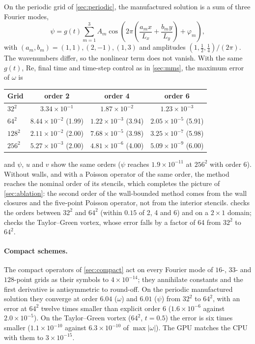 \documentclass[11pt,a4paper]{article}
\newcommand{\Rey}{\mathrm{Re}}
\newcommand{\code}[1]{\texttt{\detokenize{#1}}}
\begin{document}
On the periodic grid of \cref{sec:periodic}, the manufactured solution is a sum of three Fourier modes,
\begin{equation}
\psi=g(t)\sum_{m=1}^{3}A_m\cos\!\left(2\pi\left(\frac{a_mx}{L_x}+\frac{b_my}{L_y}\right)+\varphi_m\right),
\end{equation}
with $(a_m,b_m)=(1,1),(2,-1),(1,3)$ and amplitudes $(1,\tfrac12,\tfrac14)/(2\pi)$.  The wavenumbers differ, so the nonlinear term does not vanish.  With the same $g(t)$, $\Rey$, final time and time-step control as in \cref{sec:mms}, the maximum error of $\omega$ is
\begin{center}
\begin{tabular}{lccc}
\toprule
Grid & order 2 & order 4 & order 6 \\
\midrule
$32^2$ & $3.34\times10^{-1}$ & $1.87\times10^{-2}$ & $1.23\times10^{-3}$ \\
$64^2$ & $8.44\times10^{-2}$ (1.99) & $1.22\times10^{-3}$ (3.94) & $2.05\times10^{-5}$ (5.91) \\
$128^2$ & $2.11\times10^{-2}$ (2.00) & $7.68\times10^{-5}$ (3.98) & $3.25\times10^{-7}$ (5.98) \\
$256^2$ & $5.27\times10^{-3}$ (2.00) & $4.81\times10^{-6}$ (4.00) & $5.09\times10^{-9}$ (6.00) \\
\bottomrule
\end{tabular}
\end{center}
and $\psi$, $u$ and $v$ show the same orders ($\psi$ reaches $1.9\times10^{-11}$ at $256^2$ with order 6).  Without walls, and with a Poisson operator of the same order, the method reaches the nominal order of its stencils, which completes the picture of \cref{sec:ablation}: the second order of the wall-bounded method comes from the wall closures and the five-point Poisson operator, not from the interior stencils.  \code{make test} checks the orders between $32^2$ and $64^2$ (within $0.15$ of 2, 4 and 6) and on a $2\times1$ domain; \code{make regression} checks the Taylor--Green vortex, whose error falls by a factor of 64 from $32^2$ to $64^2$.

\paragraph{Compact schemes.}  The compact operators of \cref{sec:compact} act on every Fourier mode of $16$-, $33$- and $128$-point grids as their symbols to $4\times10^{-14}$; they annihilate constants and the first derivative is antisymmetric to round-off.  On the periodic manufactured solution they converge at order $6.04$ ($\omega$) and $6.01$ ($\psi$) from $32^2$ to $64^2$, with an error at $64^2$ twelve times smaller than explicit order 6 ($1.6\times10^{-6}$ against $2.0\times10^{-5}$).  On the Taylor--Green vortex ($64^2$, $t=0.5$) the error is six times smaller ($1.1\times10^{-10}$ against $6.3\times10^{-10}$ of $\max|\omega|$).  The GPU matches the CPU with them to $3\times10^{-15}$.
\end{document}
